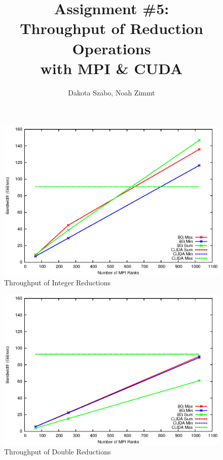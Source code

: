 \documentclass[12pt]{article}
\begin{document}
\author{Dakota Szabo, Noah Zimmt}
\title{ Assignment \#5: \\
	\textbf{
		Throughput of Reduction Operations \\
		with MPI \& CUDA
	}
}
\maketitle



\begin{figure}
	\includegraphics[width=\textwidth]{mpi/int.eps}
	\caption{Throughput of Integer Reductions}
\end{figure}

\begin{figure}
	\includegraphics[width=\textwidth]{mpi/double.eps}
	\caption{Throughput of Double Reductions}
\end{figure}
\end{document}
